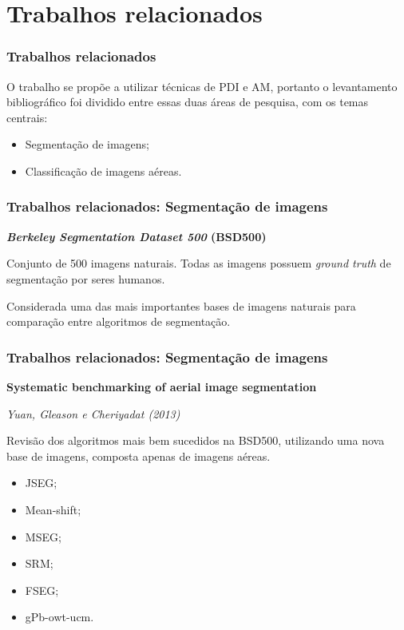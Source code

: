 \documentclass[t]{beamer}
\begin{document}

\section{Trabalhos relacionados}

\begin{frame}
	\frametitle{Trabalhos relacionados}
	
	O trabalho se propõe a utilizar técnicas de PDI e AM, portanto o levantamento bibliográfico foi dividido entre essas duas áreas de pesquisa, com os temas centrais:
	
	\vspace{0.5cm}
	
	\begin{itemize}
		\item Segmentação de imagens;
		\item Classificação de imagens aéreas.
	\end{itemize}
	
\end{frame}

\begin{frame}
	\frametitle{Trabalhos relacionados: Segmentação de imagens}
	
	\textbf{\textit{Berkeley Segmentation Dataset 500} (BSD500)}
	
	\vspace{.5cm}
		
	Conjunto de 500 imagens naturais. Todas as imagens possuem \textit{ground truth} de segmentação por seres humanos.
	
	\vspace{.5cm}
	
	Considerada uma das mais importantes bases de imagens naturais para comparação entre algoritmos de segmentação.

\end{frame}

\begin{frame}
	\frametitle{Trabalhos relacionados: Segmentação de imagens}

	\textbf{Systematic benchmarking of aerial image segmentation}
	
	\textit{Yuan, Gleason e Cheriyadat (2013)}
	
	\vspace{.5cm}
	
	Revisão dos algoritmos mais bem sucedidos na BSD500, utilizando uma nova base de imagens, composta apenas de imagens aéreas.
	
	\vspace{.5cm}
	\begin{multicols}{2}
	\begin{itemize}
		\item JSEG;
		\item Mean-shift;
		\item MSEG;
		\item SRM;
		\item FSEG;
		\item gPb-owt-ucm.
	\end{itemize}
	\end{multicols}

\end{frame}
\end{document}
